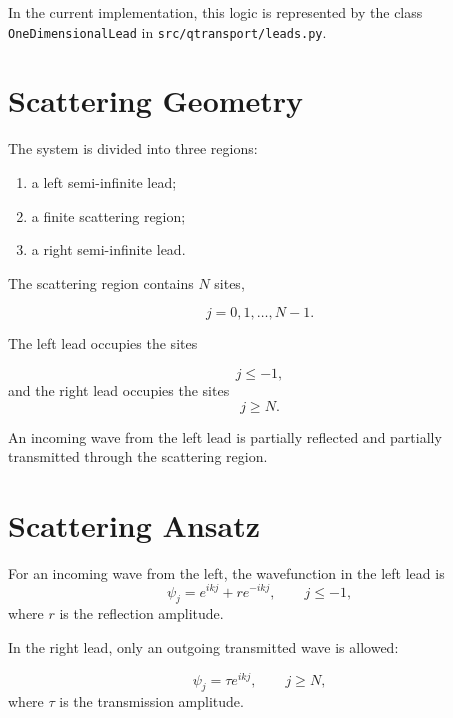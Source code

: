 In the current implementation, this logic is represented by the class
\texttt{OneDimensionalLead} in \texttt{src/qtransport/leads.py}.

\section{Scattering Geometry}

The system is divided into three regions:

\begin{enumerate}
	\item a left semi-infinite lead;
	\item a finite scattering region;
	\item a right semi-infinite lead.
\end{enumerate}

The scattering region contains $N$ sites,

\begin{equation}
	j=0,1,\ldots,N-1.
\end{equation}

The left lead occupies the sites

\begin{equation}
	j\leq -1,
\end{equation}
and the right lead occupies the sites
\begin{equation}
	j\geq N.
\end{equation}

An incoming wave from the left lead is partially reflected and partially
transmitted through the scattering region.

\section{Scattering Ansatz}

For an incoming wave from the left, the wavefunction in the left lead is
\begin{equation}
	\psi_j
	=
	e^{ikj}
	+
	r e^{-ikj},
	\qquad
	j\leq -1,
	\label{eq:left-lead-ansatz}
\end{equation}
where $r$ is the reflection amplitude.

In the right lead, only an outgoing transmitted wave is allowed:

\begin{equation}
	\psi_j
	=
	\tau e^{ikj},
	\qquad
	j\geq N,
	\label{eq:right-lead-ansatz}
\end{equation}
where $\tau$ is the transmission amplitude.

